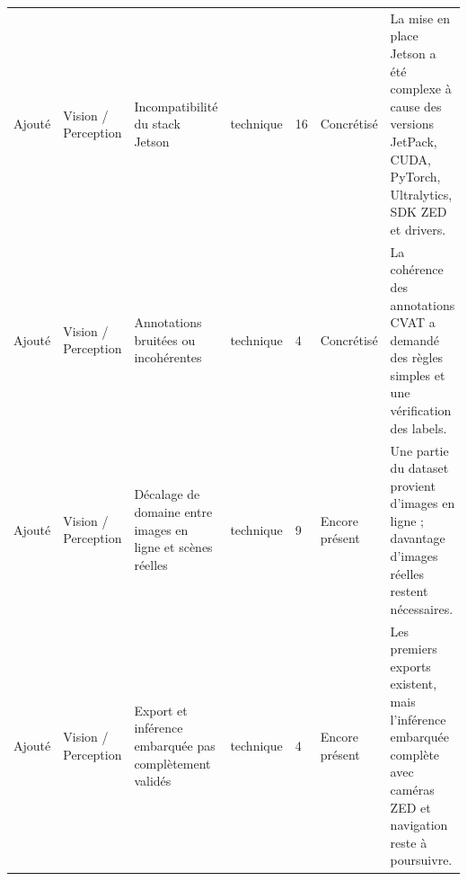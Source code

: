 \documentclass[11pt,letterpaper]{article}
\begin{document}
\begin{longtable}{@{}L{1.55cm}L{2.05cm}L{3.25cm}L{1.95cm}L{1.05cm}L{2.15cm}L{3.55cm}@{}}
    Ajouté & Vision / Perception & Incompatibilité du stack Jetson & technique & 16 & Concrétisé & La mise en place Jetson a été complexe à cause des versions JetPack, CUDA, PyTorch, Ultralytics, SDK ZED et drivers. \\
    Ajouté & Vision / Perception & Annotations bruitées ou incohérentes & technique & 4 & Concrétisé & La cohérence des annotations CVAT a demandé des règles simples et une vérification des labels. \\
    Ajouté & Vision / Perception & Décalage de domaine entre images en ligne et scènes réelles & technique & 9 & Encore présent & Une partie du dataset provient d'images en ligne ; davantage d'images réelles restent nécessaires. \\
    Ajouté & Vision / Perception & Export et inférence embarquée pas complètement validés & technique & 4 & Encore présent & Les premiers exports existent, mais l'inférence embarquée complète avec caméras ZED et navigation reste à poursuivre. \\


\end{longtable}
\end{document}
